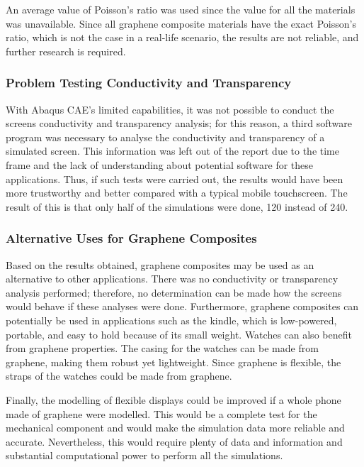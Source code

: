 \documentclass[a4paper,12pt]{article}
\numberwithin{equation}{section}
\numberwithin{figure}{section}
\begin{document}
\noindent An average value of Poisson’s ratio was used since the value for all the materials was unavailable. Since all graphene composite materials have the exact Poisson’s ratio, which is not the case in a real-life scenario, the results are not reliable, and further research is required.

\subsubsection{Problem Testing Conductivity and Transparency}

\noindent With Abaqus CAE’s limited capabilities, it was not possible to conduct the screens conductivity and transparency analysis; for this reason, a third software program was necessary to analyse the conductivity and transparency of a simulated screen. This information was left out of the report due to the time frame and the lack of understanding about potential software for these applications. Thus, if such tests were carried out, the results would have been more trustworthy and better compared with a typical mobile touchscreen. The result of this is that only half of the simulations were done, 120 instead of 240.

\subsubsection{Alternative Uses for Graphene Composites}

\noindent Based on the results obtained, graphene composites may be used as an alternative to other applications. There was no conductivity or transparency analysis performed; therefore, no determination can be made how the screens would behave if these analyses were done. Furthermore, graphene composites can potentially be used in applications such as the kindle, which is low-powered, portable, and easy to hold because of its small weight. Watches can also benefit from graphene properties. The casing for the watches can be made from graphene, making them robust yet lightweight. Since graphene is flexible, the straps of the watches could be made from graphene.\vspace{\baselineskip}

Finally, the modelling of flexible displays could be improved if a whole phone made of graphene were modelled. This would be a complete test for the mechanical component and would make the simulation data more reliable and accurate. Nevertheless, this would require plenty of data and information and substantial computational power to perform all the simulations.
\end{document}
